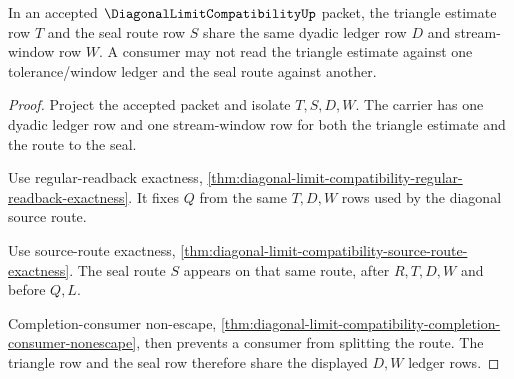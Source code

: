 \begin{theorem}
\label{thm:diagonal-limit-compatibility-triangle-seal-scope}
In an accepted $\DiagonalLimitCompatibilityUp$ packet, the triangle estimate row $T$ and the seal route row $S$ share the same dyadic ledger row $D$ and stream-window row $W$. A consumer may not read the triangle estimate against one tolerance/window ledger and the seal route against another.
\end{theorem}
\begin{proof}
Project the accepted packet and isolate $T,S,D,W$. The carrier has one dyadic ledger row and one stream-window row for both the triangle estimate and the route to the seal.

Use regular-readback exactness, \autoref{thm:diagonal-limit-compatibility-regular-readback-exactness}. It fixes $Q$ from the same $T,D,W$ rows used by the diagonal source route.

Use source-route exactness, \autoref{thm:diagonal-limit-compatibility-source-route-exactness}. The seal route $S$ appears on that same route, after $R,T,D,W$ and before $Q,L$.

Completion-consumer non-escape, \autoref{thm:diagonal-limit-compatibility-completion-consumer-nonescape}, then prevents a consumer from splitting the route. The triangle row and the seal row therefore share the displayed $D,W$ ledger rows.
\end{proof}

